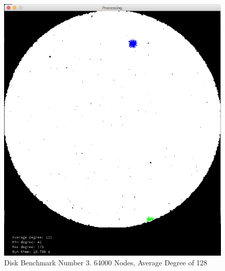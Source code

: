 \documentclass{article}
\begin{document}
\begin{figure}
    \centering
    \includegraphics[scale=0.45]{./images/disk_2.png}
    \caption{Disk Benchmark Number 3. 64000 Nodes, Average Degree of 128}
    \label{disk2}
\end{figure}
\end{document}

